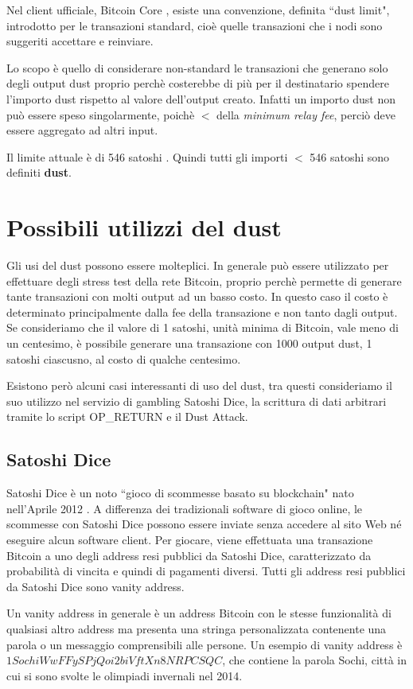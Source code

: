 Nel client ufficiale, Bitcoin Core \cite{btccore}, esiste una convenzione, definita ``dust limit", introdotto per le transazioni standard, cioè quelle transazioni che i nodi sono suggeriti accettare e reinviare.

Lo scopo è quello di considerare non-standard le transazioni che generano solo degli output dust proprio perchè costerebbe di più per il destinatario spendere l'importo dust rispetto al valore dell'output creato. Infatti un importo dust non può essere speso singolarmente, poichè $<$ della \textit{minimum relay fee}, perciò deve essere aggregato ad altri input.

Il limite attuale è di 546 satoshi \cite{BtcDev}. Quindi tutti gli importi $<$ 546 satoshi sono definiti \textbf{dust}.
\section{Possibili utilizzi del dust}
Gli usi del dust possono essere molteplici. In generale può essere utilizzato per effettuare degli stress test della rete Bitcoin, proprio perchè permette di generare tante transazioni con molti output ad un basso costo. In questo caso il costo è determinato principalmente dalla fee della transazione e non tanto dagli output. Se consideriamo che il valore di 1 satoshi, unità minima di Bitcoin, vale meno di un centesimo, è possibile generare una transazione con 1000 output dust, 1 satoshi ciascusno, al costo di qualche centesimo.

Esistono però alcuni casi interessanti di uso del dust, tra questi consideriamo il suo utilizzo nel servizio di gambling Satoshi Dice, la scrittura di dati arbitrari tramite lo script OP\_RETURN e il Dust Attack.
\subsection{Satoshi Dice}
Satoshi Dice è un noto ``gioco di scommesse basato su blockchain" nato nell'Aprile 2012 \cite{SD}. A differenza dei tradizionali software di gioco online, le scommesse con Satoshi Dice possono essere inviate senza accedere al sito Web né eseguire alcun software client. Per giocare, viene effettuata una transazione Bitcoin a uno degli address resi pubblici da Satoshi Dice, caratterizzato da probabilità di vincita e quindi di pagamenti diversi. Tutti gli address resi pubblici da Satoshi Dice sono vanity address.

Un vanity address in generale è un address Bitcoin con le stesse funzionalità di qualsiasi altro address ma presenta una stringa personalizzata contenente una parola o un messaggio comprensibili alle persone. Un esempio di vanity address è $1SochiWwFFySPjQoi2biVftXn8NRPCSQC$, che contiene la parola Sochi, città in cui si sono svolte le olimpiadi invernali nel 2014. 

